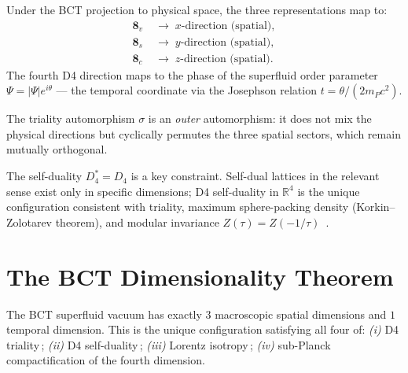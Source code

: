 \documentclass[aps,prl,twocolumn,showpacs,superscriptaddress]{revtex4-2}
\begin{document}
Under the BCT projection to physical space, the three representations
map to:
\begin{align*}
  \mathbf{8}_v &\;\longrightarrow\; x\text{-direction (spatial)},\\
  \mathbf{8}_s &\;\longrightarrow\; y\text{-direction (spatial)},\\
  \mathbf{8}_c &\;\longrightarrow\; z\text{-direction (spatial)}.
\end{align*}
The fourth D4 direction maps to the phase of the superfluid order
parameter $\Psi = |\Psi|e^{i\theta}$ --- the temporal coordinate via
the Josephson relation $t = \theta/(2m_P c^2)$.

The triality automorphism $\sigma$ is an \emph{outer} automorphism:
it does not mix the physical directions but cyclically permutes the
three spatial sectors, which remain mutually orthogonal.

The self-duality $D_4^* = D_4$ is a key constraint. Self-dual lattices
in the relevant sense exist only in specific dimensions; D4 self-duality
in $\mathbb{R}^4$ is the unique configuration consistent with triality,
maximum sphere-packing density (Korkin--Zolotarev theorem), and modular
invariance $Z(\tau) = Z(-1/\tau)$~\cite{L18}.

\section{The BCT Dimensionality Theorem}

\begin{theorem}
The BCT superfluid vacuum has exactly $3$ macroscopic spatial
dimensions and $1$ temporal dimension. This is the unique configuration
satisfying all four of\/: \emph{(i)} D4 triality\,; \emph{(ii)} D4
self-duality\,; \emph{(iii)} Lorentz isotropy\,; \emph{(iv)} sub-Planck
compactification of the fourth dimension.
\end{theorem}
\end{document}
